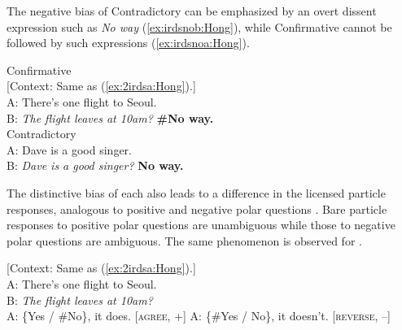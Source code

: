 \documentclass[output=paper,colorlinks,citecolor=brown]{langscibook}
\begin{document}
The negative bias of Contradictory  can be emphasized by an overt dissent expression such as \textit{No way} (\ref{ex:irdsnob:Hong}), while Confirmative  cannot be followed by such expressions (\ref{ex:irdsnoa:Hong}).

\ea \label{ex:irdsno:Hong}
    \ea \label{ex:irdsnoa:Hong} Confirmative \\
    {[Context: Same as (\ref{ex:2irdsa:Hong}).]}\\
    A: There's one flight to Seoul.\\
    B: \textit{The flight leaves at 10am?} \textbf{\#No way.}\\
    \ex \label{ex:irdsnob:Hong} Contradictory \\
    A: Dave is a good singer.\\
    B: \textit{Dave is a good singer?} \textbf{No way.}\\
    \z
\z

The distinctive bias of each  also leads to a difference in the licensed particle responses, analogous to positive and negative polar questions \citep{roelofsen2015polarity}. Bare particle responses to positive polar questions are unambiguous while those to negative polar questions are ambiguous. The same phenomenon is observed for .

\ea \label{ex:confird:Hong}
    {[Context: Same as (\ref{ex:2irdsa:Hong}).]}\\
    A: There's one flight to Seoul.\\
    B: \textit{The flight leaves at 10am?}\\
         \ea\label{ex:confirda:Hong} A: \{Yes / \#No\}, it does. \hfill[\textsc{agree}, +]
         \ex\label{ex:confirdb:Hong} A: \{\#Yes / No\}, it doesn’t. \hfill[\textsc{reverse}, --]
    \z
\z
\end{document}

